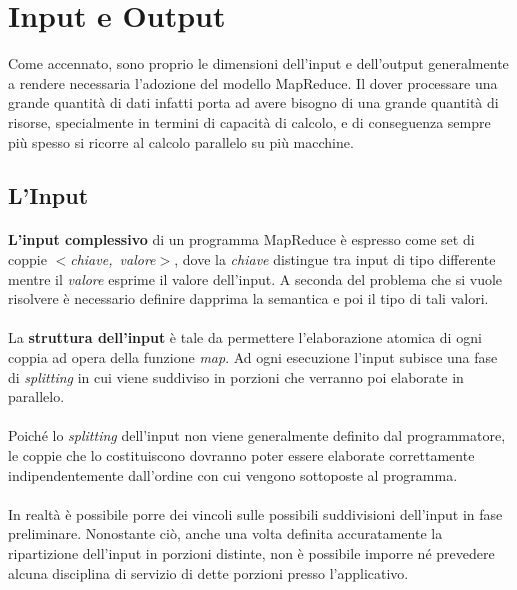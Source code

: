\documentclass[a4paper,11pt]{report}
\begin{document}
\section{Input e Output}\label{Input e Output}
Come accennato, sono proprio le dimensioni dell'input e dell'output generalmente a rendere necessaria l'adozione del modello MapReduce. Il
dover processare una grande quantità
di dati infatti porta ad avere bisogno di una grande quantità di risorse, specialmente in termini di capacità di calcolo, e di conseguenza
sempre più spesso
si ricorre al calcolo parallelo su più macchine.
\subsection{L'Input}
\paragraph{}\textbf{L'input complessivo} di un programma MapReduce è espresso come set di coppie \emph{\mbox{$<$chiave, valore$>$}}, dove la
\emph{chiave} distingue tra input di tipo
 differente mentre il \emph{valore} esprime il valore dell'input. A seconda del problema che si vuole risolvere è necessario definire
dapprima la semantica e poi il tipo di 
tali valori.
\paragraph{} La \textbf{struttura dell'input} è tale da permettere l'elaborazione atomica di ogni coppia ad opera della funzione \emph{map}.
Ad ogni esecuzione l'input subisce 
una fase di \emph{splitting} in cui viene suddiviso in porzioni che verranno poi elaborate in parallelo.
\paragraph{} Poiché lo \emph{splitting} dell'input non viene generalmente definito dal
programmatore, le coppie che lo costituiscono dovranno poter essere elaborate correttamente indipendentemente dall'ordine con cui vengono
sottoposte al programma.
\paragraph{} In realtà è possibile porre dei vincoli sulle possibili suddivisioni dell'input in fase preliminare. Nonostante ciò, anche una
volta definita accuratamente 
la ripartizione dell'input in porzioni distinte, non è possibile imporre né prevedere alcuna disciplina di servizio di dette porzioni presso
l'applicativo.
\end{document}
